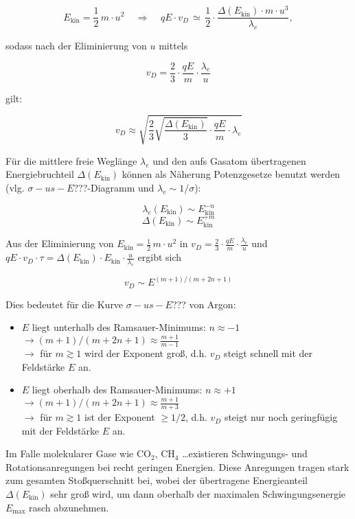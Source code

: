 \[ E_\text{kin} = \frac{1}{2}\, m \cdot u^2 ~~~~~\Rightarrow ~~~~~ qE\cdot v_D\, \simeq\,
\frac{1}{2}\cdot \frac{\Delta(E_\text{kin})\cdot m\cdot u^3}{\lambda_e} , \]

sodass nach der Eliminierung von $u$ mittels

\[v_D = \frac{2}{3} \cdot \frac{qE}{m}\cdot \frac{\lambda_e}{u} \]

gilt:

\[v_D \approx \sqrt{\frac{2}{3}\sqrt{\frac{\Delta(E_\text{kin})}{3}}\cdot \frac{qE}{m}\cdot\lambda_e}
\]

Für die mittlere freie Weglänge $\lambda_e$ und den aufs Gasatom übertragenen Energiebruchteil
$\Delta(E_\text{kin})$ können als Näherung Potenzgesetze benutzt werden (vlg.
$\sigma-us-E$???-Diagramm und $\lambda_e\sim1/\sigma$):

\[\lambda_e(E_\text{kin})\sim E_\text{kin}^{-n}  \]
\[\Delta(E_\text{kin})\sim E_\text{kin}^{+m} \]

Aus der Eliminierung von $E_\text{kin}=\frac{1}{2}\,m\cdot u^2$ in $v_D = \frac{2}{3} \cdot
\frac{qE}{m}\cdot \frac{\lambda_e}{u}$ und $qE\cdot v_D\cdot \tau = \Delta(E_\text{kin})\cdot
E_\text{kin}\cdot \frac{u}{\lambda_e}$ ergibt sich

\[v_D \sim E ^{(m+1)/(m+2n+1)}  \]

Dies bedeutet für die Kurve $\sigma-us-E$??? von Argon:

\begin{itemize}
  \item $E$ liegt unterhalb des Ramsauer-Minimums: $n\approx -1$\\
  $\rightarrow (m+1)/(m+2n+1)\approx \frac{m+1}{m-1}$\\
  $\rightarrow$ für $m\gtrsim 1$ wird der Exponent groß, d.h. $v_D$ steigt schnell mit der
  Feldstärke $E$ an.
  \item $E$ liegt oberhalb des Ramsauer-Minimums: $n\approx +1$\\
  $\rightarrow (m+1)/(m+2n+1)\approx \frac{m+1}{m+3}$\\
  $\rightarrow$ für $m\gtrsim 1$ ist der Exponent $\ge1/2$, d.h. $v_D$ steigt nur noch geringfügig
  mit der Feldstärke $E$ an.
\end{itemize}

Im Falle molekularer Gase wie CO$_2$, CH$_4$ \ldots existieren Schwingungs- und Rotationsanregungen
bei recht geringen Energien. Diese Anregungen tragen stark zum gesamten Stoßquerschnitt bei, wobei
der übertragene Energieanteil $\Delta(E_\text{kin})$ sehr groß wird, um dann oberhalb der maximalen
Schwingungsenergie $E_\text{max}$ rasch abzunehmen.

